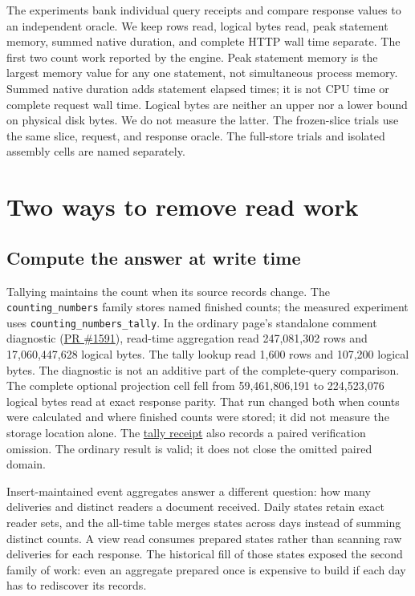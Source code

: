 \documentclass[sigconf,nonacm]{acmart}
\newcommand{\pr}[1]{\href{https://github.com/jacoby149/web10/pull/#1}{PR \##1}}
\newcommand{\record}[2]{\href{https://github.com/jacoby149/web10/blob/2f397cb13/research/experiments/costfn/#1}{#2}}
\begin{document}
The experiments bank individual query receipts and compare response values to an independent oracle. We keep rows read, logical bytes read, peak statement memory, summed native duration, and complete HTTP wall time separate. The first two count work reported by the engine. Peak statement memory is the largest memory value for any one statement, not simultaneous process memory. Summed native duration adds statement elapsed times; it is not CPU time or complete request wall time. Logical bytes are neither an upper nor a lower bound on physical disk bytes. We do not measure the latter. The frozen-slice trials use the same slice, request, and response oracle. The full-store trials and isolated assembly cells are named separately.

\section{Two ways to remove read work}
\subsection{Compute the answer at write time}
Tallying maintains the count when its source records change. The \texttt{counting\_numbers} family stores named finished counts; the measured experiment uses \texttt{counting\_numbers\_tally}. In the ordinary page's standalone comment diagnostic (\pr{1591}), read-time aggregation read 247,081,302 rows and 17,060,447,628 logical bytes. The tally lookup read 1,600 rows and 107,200 logical bytes. The diagnostic is not an additive part of the complete-query comparison. The complete optional projection cell fell from 59,461,806,191 to 224,523,076 logical bytes read at exact response parity. That run changed both when counts were calculated and where finished counts were stored; it did not measure the storage location alone. The \record{evidence/engagement-tally-20261119/RESULTS.md}{tally receipt} also records a paired verification omission. The ordinary result is valid; it does not close the omitted paired domain.

Insert-maintained event aggregates answer a different question: how many deliveries and distinct readers a document received. Daily states retain exact reader sets, and the all-time table merges states across days instead of summing distinct counts. A view read consumes prepared states rather than scanning raw deliveries for each response. The historical fill of those states exposed the second family of work: even an aggregate prepared once is expensive to build if each day has to rediscover its records.
\end{document}

